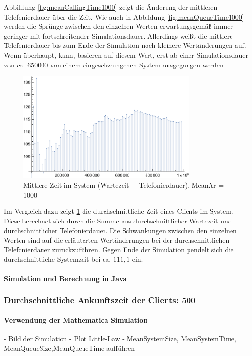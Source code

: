 Abbildung \ref{fig:meanCallingTime1000} zeigt die Änderung der mittleren Telefonierdauer über die Zeit. Wie auch in Abbildung \ref{fig:meanQueueTime1000} werden die Sprünge zwischen den einzelnen Werten erwartungsgemäß immer geringer mit fortschreitender Simulationsdauer. Allerdings weißt die mittlere Telefonierdauer bis zum Ende der Simulation noch kleinere Wertänderungen auf. Wenn überhaupt, kann, basieren auf diesem Wert, erst ab einer Simulationsdauer von ca. $650 000$ von einem eingeschwungenen System ausgegangen werden.

\begin{figure}[htpb]
	\centering
	\includegraphics[width=0.8\textwidth]{abbildungen/auswertung1000/meanSystemTimePlot.pdf}
	\caption{Mittlere Zeit im System (Wartezeit + Telefonierdauer), MeanAr = 1000}
	\label{fig:meanSystemTime1000}
\end{figure}

Im Vergleich dazu zeigt \ref{fig:meanSystemTime1000} die durchschnittliche Zeit eines Clients im System. Diese berechnet sich durch die Summe aus durchschnittlicher Wartezeit und durchschnittlicher Telefonierdauer. Die Schwankungen zwischen den einzelnen Werten sind auf die erläuterten Wertänderungen bei der durchschnittlichen Telefonierdauer zurückzuführen. Gegen Ende der Simulation pendelt sich die durchschnittliche Systemzeit bei ca. $111,1$ ein.
\paragraph{Simulation und Berechnung in Java}


\subsubsection{Durchschnittliche Ankunftszeit der Clients: 500}
\paragraph{Verwendung der Mathematica Simulation}
- Bild der Simulation 
- Plot Little-Law
- MeanSystemSize, MeanSystemTime, MeanQueueSize,MeanQueueTime aufführen
